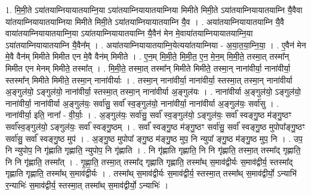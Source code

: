 \documentclass[17pt]{extarticle}
\begin{document}
1. मि॒मी॒ते ऽया॑तयाम्नियायातयाम्नि॒या ऽया॑तयाम्नियायातयाम्निया मिमीते मिमी॒ते ऽया॑तयाम्नियायातयाम्नि यै॒वैवा या॑तयाम्नियायातयाम्निया मिमीते मिमी॒ते ऽया॑तयाम्नियायातयाम्नि यै॒व । . अया॑तयाम्नियायातयाम्नि यै॒वै वाया॑तयाम्नियायातयाम्नि॒या ऽया॑तयाम्नियायातयाम्नि यै॒वैन॑ मेन मे॒वाया॑तयाम्नियायातयाम्नि॒या ऽया॑तयाम्नियायातयाम्नि यै॒वैन᳚म् । . अया॑तयाम्नियायातयाम्नि॒येत्यया॑तयाम्निया - अ॒या॒त॒या॒म्नि॒या॒ । . ए॒वैन॑ मेन मे॒वै वैन॑म् मिमीते मिमीत एन मे॒वै वैन॑म् मिमीते । . ए॒न॒म् मि॒मी॒ते॒ मि॒मी॒त॒ ए॒न॒ मे॒न॒म् मि॒मी॒ते॒ तस्मा॒त् तस्मा᳚न् मिमीत एन मेनम् मिमीते॒ तस्मा᳚त् । . मि॒मी॒ते॒ तस्मा॒त् तस्मा᳚न् मिमीते मिमीते॒ तस्मा॒न् नाना॑वीर्या॒ नाना॑वीर्या॒ स्तस्मा᳚न् मिमीते मिमीते॒ तस्मा॒न् नाना॑वीर्याः । . तस्मा॒न् नाना॑वीर्या॒ नाना॑वीर्या॒ स्तस्मा॒त् तस्मा॒न् नाना॑वीर्या अ॒ङ्गुल॑यो॒ ऽङ्गुल॑यो॒ नाना॑वीर्या॒ स्तस्मा॒त् तस्मा॒न् नाना॑वीर्या अ॒ङ्गुल॑यः । . नाना॑वीर्या अ॒ङ्गुल॑यो॒ ऽङ्गुल॑यो॒ नाना॑वीर्या॒ नाना॑वीर्या अ॒ङ्गुल॑यः॒ सर्वा॑सु॒ सर्वा᳚ स्व॒ङ्गुल॑यो॒ नाना॑वीर्या॒ नाना॑वीर्या अ॒ङ्गुल॑यः॒ सर्वा॑सु । . नाना॑वीर्या॒ इति॒ नाना᳚ - वी॒र्याः॒ । . अ॒ङ्गुल॑यः॒ सर्वा॑सु॒ सर्वा᳚ स्व॒ङ्गुल॑यो॒ ऽङ्गुल॑यः॒ सर्वा᳚ स्वङ्गु॒ष्ठ म॑ङ्गु॒ष्ठꣳ सर्वा᳚स्व॒ङ्गुल॑यो॒ ऽङ्गुल॑यः॒ सर्वा᳚ स्वङ्गु॒ष्ठम् । . सर्वा᳚ स्वङ्गु॒ष्ठ म॑ङ्गु॒ष्ठꣳ सर्वा॑सु॒ सर्वा᳚ स्वङ्गु॒ष्ठ मुपोपा᳚ङ्गु॒ष्ठꣳ सर्वा॑सु॒ सर्वा᳚ स्वङ्गु॒ष्ठ मुप॑ । . अ॒ङ्गु॒ष्ठ मुपोपा᳚ ङ्गु॒ष्ठ म॑ङ्गु॒ष्ठ मुप॒ नि न्युपा᳚ ङ्गु॒ष्ठ म॑ङ्गु॒ष्ठ मुप॒ नि । . उप॒ नि न्युपोप॒ नि गृ॑ह्णाति गृह्णाति॒ न्युपोप॒ नि गृ॑ह्णाति । . नि गृ॑ह्णाति गृह्णाति॒ नि नि गृ॑ह्णाति॒ तस्मा॒त् तस्मा᳚द् गृह्णाति॒ नि नि गृ॑ह्णाति॒ तस्मा᳚त् । . गृ॒ह्णा॒ति॒ तस्मा॒त् तस्मा᳚द् गृह्णाति गृह्णाति॒ तस्मा᳚थ् स॒माव॑द्वीर्यः स॒माव॑द्वीर्य॒ स्तस्मा᳚द् गृह्णाति गृह्णाति॒ तस्मा᳚थ् स॒माव॑द्वीर्यः । . तस्मा᳚थ् स॒माव॑द्वीर्यः स॒माव॑द्वीर्य॒ स्तस्मा॒त् तस्मा᳚थ् स॒माव॑द्वीर्यो॒ ऽन्याभि॑ र॒न्याभिः॑ स॒माव॑द्वीर्य॒ स्तस्मा॒त् तस्मा᳚थ् स॒माव॑द्वीर्यो॒ ऽन्याभिः॑ । \newline
\end{document}

